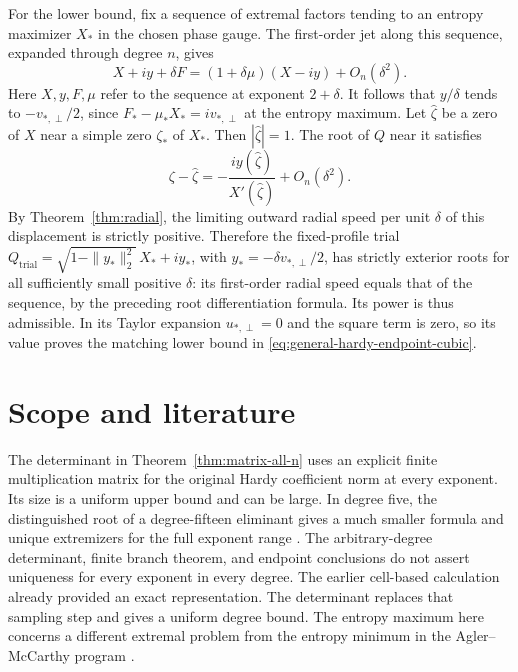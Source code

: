 \documentclass[11pt]{article}
\begin{document}
For the lower bound, fix a sequence of extremal factors tending
to an entropy maximizer \(X_*\) in the chosen phase gauge.
The first-order jet along this sequence, expanded through
degree \(n\), gives
\[
 X+i y+\delta F=(1+\delta\mu)(X-i y)+O_n(\delta^2).
\]
Here \(X,y,F,\mu\) refer to the sequence at exponent \(2+\delta\).
It follows that \(y/\delta\) tends to \(-v_{*,\perp}/2\), since
\(F_*-\mu_* X_*=i v_{*,\perp}\) at the entropy maximum.
Let \(\widehat\zeta\) be a zero of \(X\) near a simple zero
\(\zeta_*\) of \(X_*\). Then \(|\widehat\zeta|=1\). The root of
\(Q\) near it satisfies
\[
 \zeta-\widehat\zeta
 =-\frac{i y(\widehat\zeta)}{X'(\widehat\zeta)}+O_n(\delta^2).
\]
By Theorem~\ref{thm:radial}, the limiting outward radial speed
per unit \(\delta\) of this displacement is strictly positive.
Therefore the fixed-profile trial
\(Q_{\mathrm{trial}}=\sqrt{1-\|y_*\|_2^2}\,X_*+i y_*\), with
\(y_*=-\delta v_{*,\perp}/2\), has strictly exterior roots for
all sufficiently small positive \(\delta\): its first-order
radial speed equals that of the sequence, by the preceding root
differentiation formula. Its power is thus admissible. In its
Taylor expansion \(u_{*,\perp}=0\) and the square term is zero,
so its value proves the matching lower bound in
\eqref{eq:general-hardy-endpoint-cubic}.

\section{Scope and literature}

The determinant in Theorem~\ref{thm:matrix-all-n} uses an
explicit finite multiplication matrix for the original Hardy
coefficient norm at every exponent. Its size is a uniform
upper bound and can be large. In degree five, the distinguished
root of a degree-fifteen eliminant gives a much smaller formula
and unique extremizers for the full exponent range \cite{Fifth}.
The arbitrary-degree determinant, finite branch theorem,
and endpoint conclusions do not assert uniqueness for every
exponent in every degree. The earlier cell-based calculation
\cite{Low} already provided an exact representation. The
determinant replaces that sampling step and gives a uniform
degree bound. The entropy maximum here concerns a different
extremal problem from the entropy minimum in the
Agler--McCarthy program \cite{Agler,LeiZhang}.
\end{document}
